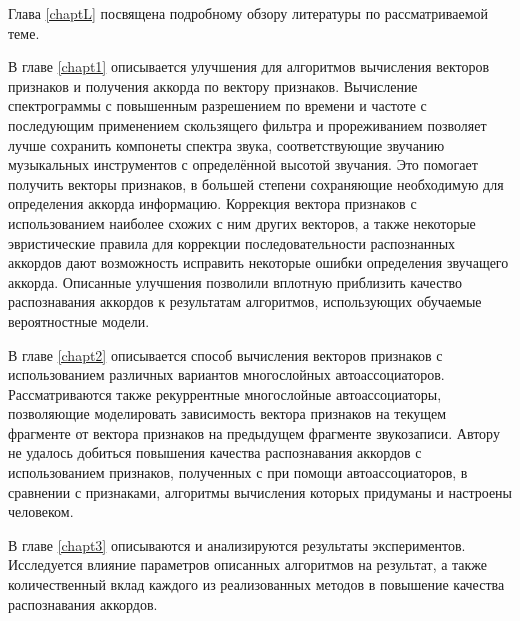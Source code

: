 Глава \ref{chaptL} посвящена подробному обзору литературы по рассматриваемой
теме. 

В главе \ref{chapt1} описывается улучшения для алгоритмов вычисления векторов
признаков и получения аккорда по вектору признаков. Вычисление спектрограммы с
повышенным разрешением по времени и частоте с последующим применением
скользящего фильтра и прореживанием позволяет лучше сохранить компонеты спектра
звука, соответствующие звучанию музыкальных инструментов с определённой высотой
звучания. Это помогает получить векторы признаков, в большей степени сохраняющие
необходимую для определения аккорда информацию. Коррекция вектора признаков с
использованием наиболее схожих с ним других векторов, а также некоторые
эвристические правила для коррекции последовательности распознанных аккордов
дают возможность исправить некоторые ошибки определения звучащего аккорда.
Описанные улучшения позволили вплотную приблизить качество распознавания
аккордов к результатам алгоритмов, использующих обучаемые вероятностные модели.

В главе \ref{chapt2} описывается способ вычисления векторов признаков с
использованием различных вариантов многослойных автоассоциаторов.
Рассматриваются также рекуррентные многослойные автоассоциаторы, позволяющие
моделировать зависимость вектора признаков на текущем фрагменте от вектора
признаков на предыдущем фрагменте звукозаписи. Автору не удалось добиться
повышения качества распознавания аккордов с использованием признаков,
полученных с при помощи автоассоциаторов, в сравнении с признаками, алгоритмы
вычисления которых придуманы и настроены человеком.

В главе \ref{chapt3} описываются и анализируются результаты экспериментов.
Исследуется влияние параметров описанных алгоритмов на результат, а также
количественный вклад каждого из реализованных методов в повышение качества
распознавания аккордов.


% 





